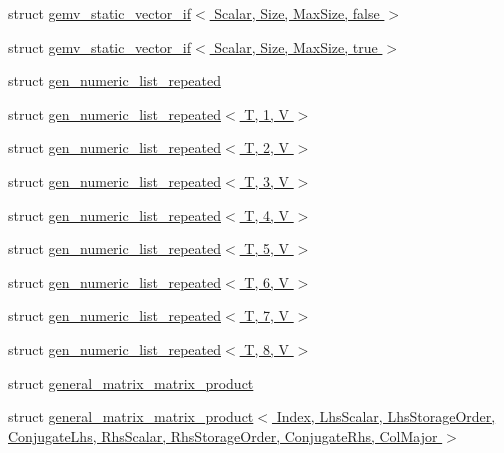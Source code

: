 \begin{DoxyCompactItemize}
\item 
struct \hyperlink{struct_eigen_1_1internal_1_1gemv__static__vector__if_3_01_scalar_00_01_size_00_01_max_size_00_01false_01_4}{gemv\+\_\+static\+\_\+vector\+\_\+if$<$ Scalar, Size, Max\+Size, false $>$}
\item 
struct \hyperlink{struct_eigen_1_1internal_1_1gemv__static__vector__if_3_01_scalar_00_01_size_00_01_max_size_00_01true_01_4}{gemv\+\_\+static\+\_\+vector\+\_\+if$<$ Scalar, Size, Max\+Size, true $>$}
\item 
struct \hyperlink{struct_eigen_1_1internal_1_1gen__numeric__list__repeated}{gen\+\_\+numeric\+\_\+list\+\_\+repeated}
\item 
struct \hyperlink{struct_eigen_1_1internal_1_1gen__numeric__list__repeated_3_01_t_00_011_00_01_v_01_4}{gen\+\_\+numeric\+\_\+list\+\_\+repeated$<$ T, 1, V $>$}
\item 
struct \hyperlink{struct_eigen_1_1internal_1_1gen__numeric__list__repeated_3_01_t_00_012_00_01_v_01_4}{gen\+\_\+numeric\+\_\+list\+\_\+repeated$<$ T, 2, V $>$}
\item 
struct \hyperlink{struct_eigen_1_1internal_1_1gen__numeric__list__repeated_3_01_t_00_013_00_01_v_01_4}{gen\+\_\+numeric\+\_\+list\+\_\+repeated$<$ T, 3, V $>$}
\item 
struct \hyperlink{struct_eigen_1_1internal_1_1gen__numeric__list__repeated_3_01_t_00_014_00_01_v_01_4}{gen\+\_\+numeric\+\_\+list\+\_\+repeated$<$ T, 4, V $>$}
\item 
struct \hyperlink{struct_eigen_1_1internal_1_1gen__numeric__list__repeated_3_01_t_00_015_00_01_v_01_4}{gen\+\_\+numeric\+\_\+list\+\_\+repeated$<$ T, 5, V $>$}
\item 
struct \hyperlink{struct_eigen_1_1internal_1_1gen__numeric__list__repeated_3_01_t_00_016_00_01_v_01_4}{gen\+\_\+numeric\+\_\+list\+\_\+repeated$<$ T, 6, V $>$}
\item 
struct \hyperlink{struct_eigen_1_1internal_1_1gen__numeric__list__repeated_3_01_t_00_017_00_01_v_01_4}{gen\+\_\+numeric\+\_\+list\+\_\+repeated$<$ T, 7, V $>$}
\item 
struct \hyperlink{struct_eigen_1_1internal_1_1gen__numeric__list__repeated_3_01_t_00_018_00_01_v_01_4}{gen\+\_\+numeric\+\_\+list\+\_\+repeated$<$ T, 8, V $>$}
\item 
struct \hyperlink{struct_eigen_1_1internal_1_1general__matrix__matrix__product}{general\+\_\+matrix\+\_\+matrix\+\_\+product}
\item 
struct \hyperlink{struct_eigen_1_1internal_1_1general__matrix__matrix__product_3_01_index_00_01_lhs_scalar_00_01_lc92e3fc5d91273c14187477f2d000bbe}{general\+\_\+matrix\+\_\+matrix\+\_\+product$<$ Index, Lhs\+Scalar, Lhs\+Storage\+Order, Conjugate\+Lhs, Rhs\+Scalar, Rhs\+Storage\+Order, Conjugate\+Rhs, Col\+Major $>$}

\end{DoxyCompactItemize}
